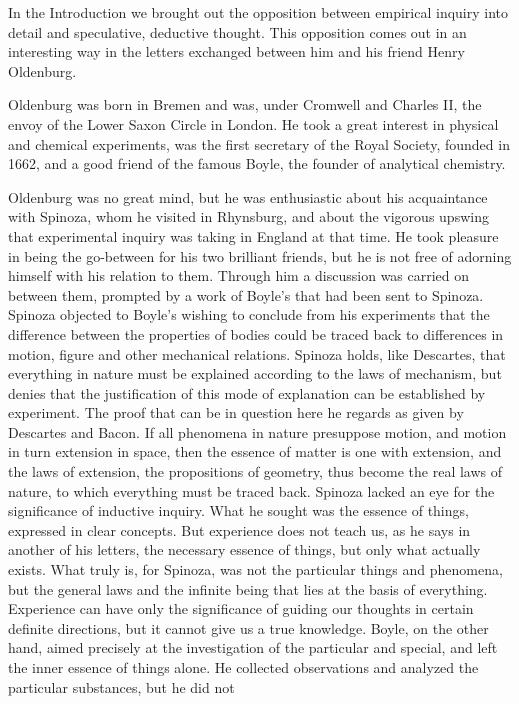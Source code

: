 \documentclass[12pt]{book}
\newcommand{\opage}[1]{\marginnote{\footnotesize\textit{[#1]}}}
\begin{document}
In the Introduction we brought out the opposition between empirical inquiry into
detail and speculative, deductive thought. This opposition comes out in an
interesting way in the letters exchanged between him and his friend Henry Oldenburg.

Oldenburg was born in Bremen and was, under Cromwell and Charles II, the envoy of the
Lower Saxon Circle in London. He took a great interest in physical and chemical
experiments, was the first secretary of the Royal Society, founded in 1662, and a good
friend of the famous Boyle, the founder of analytical chemistry.

\opage{45}Oldenburg was no great mind, but he was enthusiastic about his acquaintance
with Spinoza, whom he visited in Rhynsburg, and about the vigorous upswing that
experimental inquiry was taking in England at that time. He took pleasure in being the
go-between for his two brilliant friends, but he is not free of adorning himself with
his relation to them. Through him a discussion was carried on between them, prompted
by a work of Boyle's that had been sent to Spinoza. Spinoza objected to Boyle's wishing
to conclude from his experiments that the difference between the properties of bodies
could be traced back to differences in motion, figure and other mechanical relations.
Spinoza holds, like Descartes, that everything in nature must be explained according
to the laws of mechanism, but denies that the justification of this mode of
explanation can be established by experiment. The proof that can be in question here
he regards as given by Descartes and Bacon. If all phenomena in nature presuppose
motion, and motion in turn extension in space, then the essence of matter is one with
extension, and the laws of extension, the propositions of geometry, thus become the
real laws of nature, to which everything must be traced back. Spinoza lacked an eye
for the significance of inductive inquiry. What he sought was the essence of things,
expressed in clear concepts. But experience does not teach us, as he says in another
of his letters, the necessary essence of things, but only what actually exists. What
truly is, for Spinoza, was not the particular things and phenomena, but the general
laws and the infinite being that lies at the basis of everything. Experience can have
only the significance of guiding our thoughts in \opage{46}certain definite directions,
but it cannot give us a true knowledge. Boyle, on the other hand, aimed precisely at
the investigation of the particular and special, and left the inner essence of things
alone. He collected observations and analyzed the particular substances, but he did not
\end{document}
